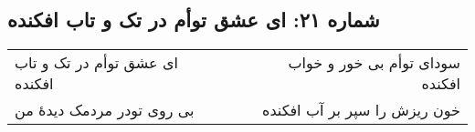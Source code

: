 \begin{center}
\section*{شماره ۲۱: ای عشق توأم در تک و تاب افکنده}
\label{sec:021}
\begin{longtable}{l p{0.5cm} r}
ای عشق توأم در تک و تاب افکنده
&&
سودای توأم بی خور و خواب افکنده
\\
بی روی تودر مردمک دیدهٔ من
&&
خون ریزش را سپر بر آب افکنده
\\
\end{longtable}
\end{center}
